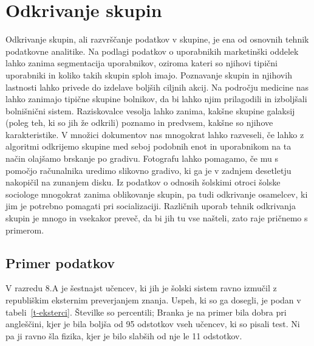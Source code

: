 \chapter{Odkrivanje skupin}

Odkrivanje skupin, ali razvrščanje podatkov v skupine, je ena od
osnovnih tehnik podatkovne analitike. Na podlagi podatkov o
uporabnikih marketinški oddelek lahko zanima segmentacija uporabnikov,
oziroma kateri so njihovi tipični uporabniki in koliko takih skupin
sploh imajo. Poznavanje skupin in njihovih lastnosti lahko privede do
izdelave boljših ciljnih akcij. Na področju medicine nas lahko
zanimajo tipične skupine bolnikov, da bi lahko njim prilagodili in
izboljšali bolnišnični sistem. Raziskovalce vesolja lahko zanima,
kakšne skupine galaksij (poleg teh, ki so jih že odkrili) poznamo in
predvsem, kakšne so njihove karakteristike. V množici dokumentov nas
mnogokrat lahko razveseli, če lahko z algoritmi odkrijemo skupine med
seboj podobnih enot in uporabnikom na ta način olajšamo brskanje po
gradivu. Fotografu lahko pomagamo, če mu s pomočjo računalnika
uredimo slikovno gradivo, ki ga je v zadnjem desetletju nakopičil na
zunanjem disku. Iz podatkov o odnosih šolskimi otroci šolske sociologe
mnogokrat zanima oblikovanje skupin, pa tudi odkrivanje osamelcev, ki
jim je potrebno pomagati pri socializaciji. Različnih uporab tehnik
odkrivanja skupin je mnogo in vsekakor preveč, da bi jih tu vse
našteli, zato raje pričnemo s primerom.

\section{Primer podatkov}

V razredu 8.A je šestnajst učencev, ki jih je šolski sistem ravno
izmučil z republiškim eksternim preverjanjem znanja. Uspeh, ki so ga
dosegli, je podan v tabeli~\ref{t-eksterci}. Številke so percentili;
Branka je na primer bila dobra pri angleščini, kjer je bila boljša od
95 odstotkov vseh učencev, ki so pisali test. Ni pa ji ravno šla
fizika, kjer je bilo slabših od nje le 11 odstotkov.


